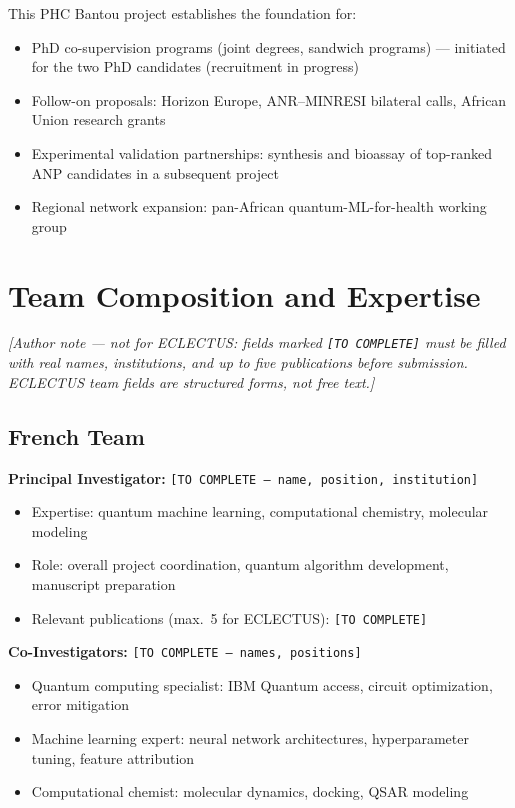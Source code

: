 \documentclass[11pt,a4paper]{article}
\begin{document}
This PHC Bantou project establishes the foundation for:
\begin{itemize}
    \item PhD co-supervision programs (joint degrees, sandwich programs) --- initiated for the two PhD candidates (recruitment in progress)
    \item Follow-on proposals: Horizon Europe, ANR--MINRESI bilateral calls, African Union research grants
    \item Experimental validation partnerships: synthesis and bioassay of top-ranked ANP candidates in a subsequent project
    \item Regional network expansion: pan-African quantum-ML-for-health working group
\end{itemize}

\section{Team Composition and Expertise}

\textit{[Author note --- not for ECLECTUS: fields marked \texttt{[TO COMPLETE]} must be filled with real names, institutions, and up to five publications before submission. ECLECTUS team fields are structured forms, not free text.]}

\subsection{French Team}

\textbf{Principal Investigator:} \texttt{[TO COMPLETE --- name, position, institution]}
\begin{itemize}
    \item Expertise: quantum machine learning, computational chemistry, molecular modeling
    \item Role: overall project coordination, quantum algorithm development, manuscript preparation
    \item Relevant publications (max.\ 5 for ECLECTUS): \texttt{[TO COMPLETE]}
\end{itemize}

\textbf{Co-Investigators:} \texttt{[TO COMPLETE --- names, positions]}
\begin{itemize}
    \item Quantum computing specialist: IBM Quantum access, circuit optimization, error mitigation
    \item Machine learning expert: neural network architectures, hyperparameter tuning, feature attribution
    \item Computational chemist: molecular dynamics, docking, QSAR modeling
\end{itemize}
\end{document}
